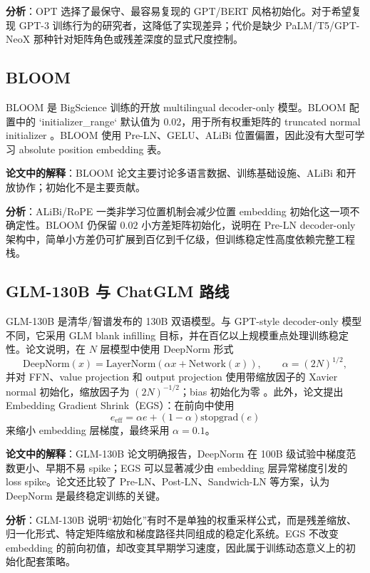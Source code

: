 \documentclass[UTF8,a4paper,11pt]{ctexart}
\begin{document}
\textbf{分析}：OPT 选择了最保守、最容易复现的 GPT/BERT 风格初始化。对于希望复现 GPT-3 训练行为的研究者，这降低了实现差异；代价是缺少 PaLM/T5/GPT-NeoX 那种针对矩阵角色或残差深度的显式尺度控制。

\subsection{BLOOM}

BLOOM 是 BigScience 训练的开放 multilingual decoder-only 模型。BLOOM 配置中的 `initializer\_range` 默认值为 $0.02$，用于所有权重矩阵的 truncated normal initializer \cite{bloomdocs,bloompaper}。BLOOM 使用 Pre-LN、GELU、ALiBi 位置偏置，因此没有大型可学习 absolute position embedding 表。

\textbf{论文中的解释}：BLOOM 论文主要讨论多语言数据、训练基础设施、ALiBi 和开放协作；初始化不是主要贡献。

\textbf{分析}：ALiBi/RoPE 一类非学习位置机制会减少位置 embedding 初始化这一项不确定性。BLOOM 仍保留 $0.02$ 小方差矩阵初始化，说明在 Pre-LN decoder-only 架构中，简单小方差仍可扩展到百亿到千亿级，但训练稳定性高度依赖完整工程栈。

\subsection{GLM-130B 与 ChatGLM 路线}

GLM-130B 是清华/智谱发布的 130B 双语模型。与 GPT-style decoder-only 模型不同，它采用 GLM blank infilling 目标，并在百亿以上规模重点处理训练稳定性。论文说明，在 $N$ 层模型中使用 DeepNorm 形式
\[
  \mathrm{DeepNorm}(x)=\mathrm{LayerNorm}(\alpha x+\mathrm{Network}(x)),\qquad \alpha=(2N)^{1/2},
\]
并对 FFN、value projection 和 output projection 使用带缩放因子的 Xavier normal 初始化，缩放因子为 $(2N)^{-1/2}$；bias 初始化为零 \cite{glm130b}。此外，论文提出 Embedding Gradient Shrink（EGS）：在前向中使用
\[
  e_{\mathrm{eff}}=\alpha e+(1-\alpha)\mathrm{stopgrad}(e)
\]
来缩小 embedding 层梯度，最终采用 $\alpha=0.1$。

\textbf{论文中的解释}：GLM-130B 论文明确报告，DeepNorm 在 100B 级试验中梯度范数更小、早期不易 spike；EGS 可以显著减少由 embedding 层异常梯度引发的 loss spike。论文还比较了 Pre-LN、Post-LN、Sandwich-LN 等方案，认为 DeepNorm 是最终稳定训练的关键。

\textbf{分析}：GLM-130B 说明“初始化”有时不是单独的权重采样公式，而是残差缩放、归一化形式、特定矩阵缩放和梯度路径共同组成的稳定化系统。EGS 不改变 embedding 的前向初值，却改变其早期学习速度，因此属于训练动态意义上的初始化配套策略。
\end{document}
